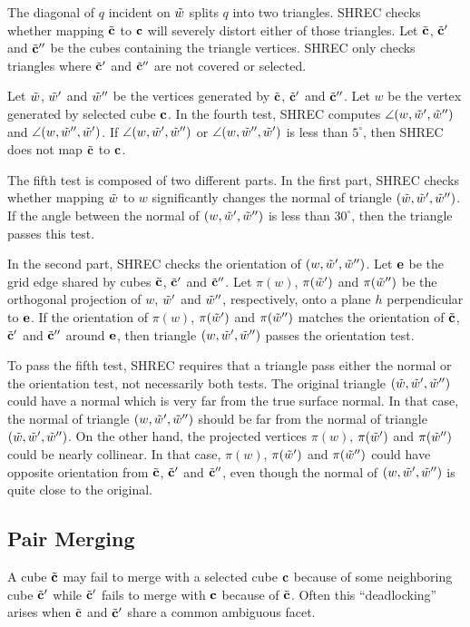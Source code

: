 The diagonal of $q$ incident on $\tilde{w}$ splits $q$ into two triangles.
SHREC checks whether mapping ${\tilde{\mathbf{c}}}$ to $\mathbf{c}$ will severely distort
either of those triangles.
Let ${\tilde{\mathbf{c}}}$, ${\tilde{\mathbf{c}}}'$ and ${\tilde{\mathbf{c}}}''$ be the cubes 
containing the triangle vertices.
SHREC only checks triangles where ${\tilde{\mathbf{c}}}'$ and ${\tilde{\mathbf{c}}}''$ 
are not covered or selected.

Let $\tilde{w}$, $\tilde{w}'$ and $\tilde{w}''$ be the vertices generated
by ${\tilde{\mathbf{c}}}$, ${\tilde{\mathbf{c}}}'$ and ${\tilde{\mathbf{c}}}''$.
Let $w$ be the vertex generated by selected cube $\mathbf{c}$.
In the fourth test,
SHREC computes $\angle(w,\tilde{w}',\tilde{w}'')$ and $\angle(w,\tilde{w}'',\tilde{w}')$.
If $\angle(w,\tilde{w}',\tilde{w}'')$ or $\angle(w,\tilde{w}'',\tilde{w}')$ is less than $5^\circ$,
then SHREC does not map ${\tilde{\mathbf{c}}}$ to $\mathbf{c}$.

The fifth test is composed of two different parts.
In the first part,
SHREC checks whether mapping $\tilde{w}$ to $w$
significantly changes the normal of triangle $(\tilde{w},\tilde{w}',\tilde{w}'')$.
If the angle between the normal of $(w, \tilde{w}', \tilde{w}'')$ is less than $30^\circ$,
then the triangle passes this test.

In the second part, SHREC checks the orientation of $(w, \tilde{w}', \tilde{w}'')$.
Let $\mathbf{e}$ be the grid edge shared by cubes ${\tilde{\mathbf{c}}}$, ${\tilde{\mathbf{c}}}'$ and ${\tilde{\mathbf{c}}}''$.
Let $\pi(w)$, $\pi(\tilde{w}')$ and $\pi(\tilde{w}'')$ be the orthogonal projection
of $w$, $\tilde{w}'$ and $\tilde{w}''$, respectively, 
onto a plane $h$ perpendicular to $\mathbf{e}$.
If the orientation of $\pi(w)$, $\pi(\tilde{w}')$ and $\pi(\tilde{w}'')$
matches the orientation of ${\tilde{\mathbf{c}}}$, ${\tilde{\mathbf{c}}}'$ and ${\tilde{\mathbf{c}}}''$ around $\mathbf{e}$,
then triangle $(w,\tilde{w}',\tilde{w}'')$ passes the orientation test.

To pass the fifth test,
SHREC requires that a triangle pass either the normal or the orientation test,
not necessarily both tests.
The original triangle $(\tilde{w},\tilde{w}',\tilde{w}'')$ could have a normal which
is very far from the true surface normal.
In that case, the normal of triangle $(w, \tilde{w}', \tilde{w}'')$ should
be far from the normal of triangle $(\tilde{w}, \tilde{w}', \tilde{w}'')$.
On the other hand,
the projected vertices $\pi(w)$, $\pi(\tilde{w}')$ and $\pi(\tilde{w}'')$
could be nearly collinear.
In that case, $\pi(w)$, $\pi(\tilde{w}')$ and $\pi(\tilde{w}'')$ could have
opposite orientation from ${\tilde{\mathbf{c}}}$, ${\tilde{\mathbf{c}}}'$ and ${\tilde{\mathbf{c}}}''$,
even though the normal of $(w,\tilde{w}',\tilde{w}'')$ is quite close
to the original.


\subsection{Pair Merging}
\label{section:pair_merging}

A cube ${\tilde{\mathbf{c}}}$ may fail to merge with a selected cube $\mathbf{c}$
because of some neighboring cube ${\tilde{\mathbf{c}}}'$
while ${\tilde{\mathbf{c}}}'$ fails to merge with $\mathbf{c}$ because of ${\tilde{\mathbf{c}}}$.
Often this ``deadlocking'' arises when ${\tilde{\mathbf{c}}}$ and ${\tilde{\mathbf{c}}}'$ share
a common ambiguous facet.

